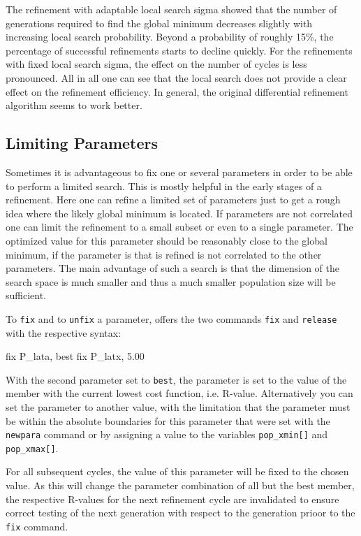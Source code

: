 The refinement with adaptable local search sigma showed that the number
of generations required to find the global minimum decreases slightly
with increasing local search probability. Beyond a probability of roughly
15\%, the percentage of successful refinements starts to decline quickly.
For the refinements with fixed local search sigma, the effect on the
number of cycles is less pronounced. All in all one can see that the local 
search does not provide a clear effect on the refinement efficiency. 
In general, the original differential refinement algorithm seems to 
work better. 

\subsection{Limiting Parameters}

Sometimes it is advantageous to fix one or several parameters in order
to be able to perform a limited search. This is mostly helpful in the 
early stages of a refinement. Here one can refine a limited set of
parameters just to get a rough idea where the likely global minimum is
located. If parameters are not correlated one can limit the refinement
to a small subset or even to a single parameter. The optimized value
for this parameter should be reasonably close to the global minimum, 
if the parameter is that is refined is not correlated to the other
parameters. The main advantage of such a search is that the dimension of
the search space is much smaller and thus a much smaller population size 
will be sufficient.

To {\tt fix} and to {\tt unfix} a parameter, \Diffev offers the two
commands {\tt fix} and {\tt release} with the respective syntax:

\begin{MacVerbatim}
fix P_lata, best
fix P_latx, 5.00
\end{MacVerbatim}

With the second parameter set to {\tt best}, the parameter is set to the 
value of the member with the current lowest cost function, i.e. R-value.
Alternatively you can set the parameter to another value, with the limitation
that the parameter must be within the absolute boundaries for this 
parameter that were set with the {\tt newpara} command or by assigning a
value to the variables {\tt pop\_xmin[]} and {\tt pop\_xmax[]}.

For all subsequent cycles, the value of this parameter will be fixed to
the chosen value. As this will change the parameter combination of all
but the best member, the respective R-values for the next refinement 
cycle are invalidated to ensure correct testing of the next generation 
with respect to the generation prioor to the {\tt fix} command.

